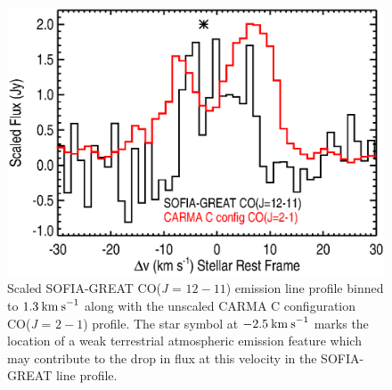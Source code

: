 \documentclass[iop]{emulateapj}
\begin{document}
\begin{figure}[hbt!]
\centering
\includegraphics[trim=60pt 0pt 0pt 0pt, scale=0.5]{f19.eps}
\caption{Scaled SOFIA-GREAT CO(\textit{J} = $12-11$) emission line profile binned to $1.3\>{\rm km\>s}^{-1}$ along with the unscaled CARMA C configuration CO(\textit{J} = $2-1$) profile. The star symbol at $-2.5\>{\rm km\>s}^{-1}$ marks the location of a weak terrestrial atmospheric emission feature which may contribute to the drop in flux at this velocity in the SOFIA-GREAT line profile.}
\label{fig:fig8}
\end{figure}
\end{document}
